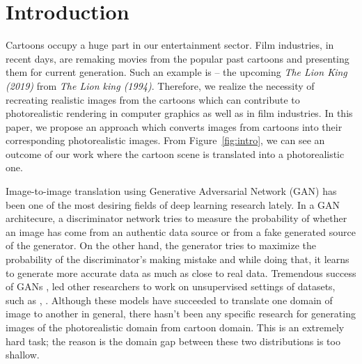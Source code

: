 \documentclass[conference]{IEEEtran}
\begin{document}
\section{Introduction}
Cartoons occupy a huge part in our entertainment sector.
Film industries, in recent days, are remaking movies from the popular past cartoons and presenting them for current generation. Such an example is --
the upcoming \textit{The Lion King (2019)} from \textit{The Lion king (1994)}. %
Therefore, we realize the necessity of recreating realistic images from the cartoons which can contribute to photorealistic rendering in computer graphics as well as in film industries. 
In this paper, we propose an approach which converts images from cartoons into their corresponding photorealistic images. From Figure~\ref{fig:intro}, we can see an outcome of our work where the cartoon scene is translated into a photorealistic one.

Image-to-image translation using Generative Adversarial Network (GAN)\cite{DBLP:conf/nips/GoodfellowPMXWOCB14} has been one of the most desiring fields of deep learning research lately. In a GAN architecure, a discriminator network tries to measure the probability of whether an image has come from an authentic data source or from a fake generated source of the generator. On the other hand, the generator tries to maximize the probability of the discriminator's making mistake and while doing that, it learns to generate more accurate data as much as close to real data. 
Tremendous success of GANs \cite{DBLP:conf/nips/GoodfellowPMXWOCB14}, led other researchers to work on unsupervised settings of datasets, such as \cite{DBLP:conf/iccv/ZhuPIE17}, \cite{DBLP:conf/icml/KimCKLK17}. Although these models have succeeded to translate one domain of image to another in general, there hasn't been any specific research for generating images of the photorealistic domain from cartoon domain.
This is an extremely hard task; the reason is the domain gap between these two distributions is too shallow.
\end{document}
